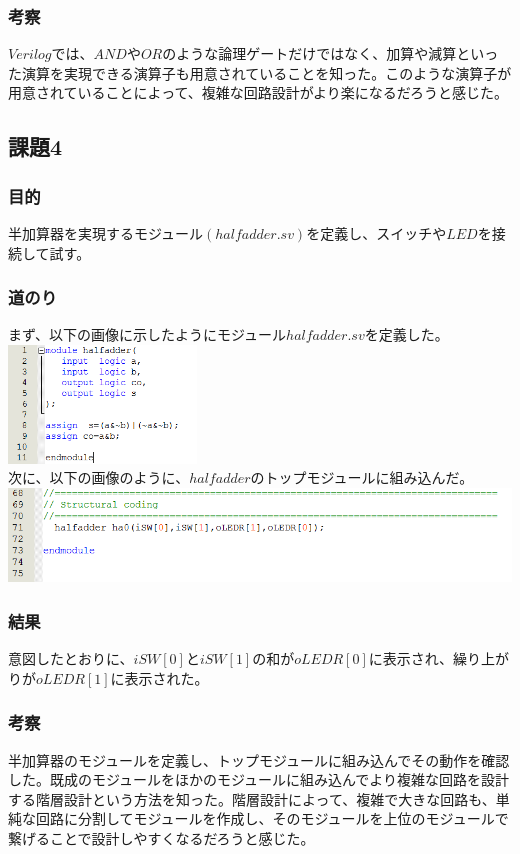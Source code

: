 \documentclass[a4paper]{jarticle}
\begin{document}
\subsubsection{考察}
$Verilog$では、$AND$や$OR$のような論理ゲートだけではなく、加算や減算といった演算を実現できる演算子も用意されていることを知った。このような演算子が用意されていることによって、複雑な回路設計がより楽になるだろうと感じた。
\subsection{課題4}
\subsubsection{目的}
半加算器を実現するモジュール$\left( halfadder.sv \right)$を定義し、スイッチや$LED$を接続して試す。
\subsubsection{道のり}
まず、以下の画像に示したようにモジュール$halfadder.sv$を定義した。\\
\includegraphics[width=5cm]{work4/4-2.PNG}\\
次に、以下の画像のように、$halfadder$のトップモジュールに組み込んだ。\\
\includegraphics[width=15cm]{work4/4-1.PNG}
\subsubsection{結果}
意図したとおりに、$iSW[0]$と$iSW[1]$の和が$oLEDR[0]$に表示され、繰り上がりが$oLEDR[1]$に表示された。
\subsubsection{考察}
半加算器のモジュールを定義し、トップモジュールに組み込んでその動作を確認した。既成のモジュールをほかのモジュールに組み込んでより複雑な回路を設計する階層設計という方法を知った。階層設計によって、複雑で大きな回路も、単純な回路に分割してモジュールを作成し、そのモジュールを上位のモジュールで繋げることで設計しやすくなるだろうと感じた。
\end{document}
